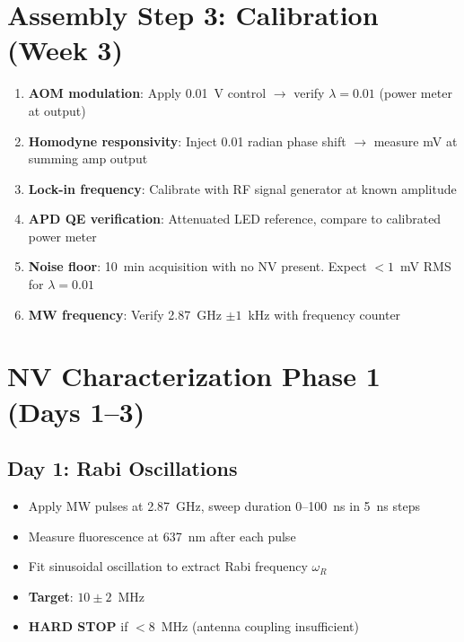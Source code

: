 \documentclass[11pt,a4paper,openany]{book}
\begin{document}

\section{Assembly Step 3: Calibration (Week 3)}

\begin{enumerate}[nosep]
  \item \textbf{AOM modulation}: Apply 0.01~V control $\to$ verify $\lambda = 0.01$ (power meter at output)
  \item \textbf{Homodyne responsivity}: Inject 0.01 radian phase shift $\to$ measure mV at summing amp output
  \item \textbf{Lock-in frequency}: Calibrate with RF signal generator at known amplitude
  \item \textbf{APD QE verification}: Attenuated LED reference, compare to calibrated power meter
  \item \textbf{Noise floor}: 10~min acquisition with no NV present. Expect $< 1$~mV RMS for $\lambda = 0.01$
  \item \textbf{MW frequency}: Verify 2.87~GHz $\pm 1$~kHz with frequency counter
\end{enumerate}

\section{NV Characterization Phase 1 (Days 1--3)}

\subsection{Day 1: Rabi Oscillations}

\begin{itemize}[nosep]
  \item Apply MW pulses at 2.87~GHz, sweep duration 0--100~ns in 5~ns steps
  \item Measure fluorescence at 637~nm after each pulse
  \item Fit sinusoidal oscillation to extract Rabi frequency $\omega_R$
  \item \textbf{Target}: $10 \pm 2$~MHz
  \item \textbf{HARD STOP} if $< 8$~MHz (antenna coupling insufficient)
\end{itemize}
\end{document}
